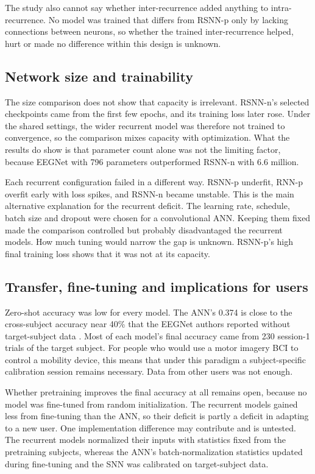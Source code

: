 \documentclass[conference]{IEEEtran}
\begin{document}
The study also cannot say whether inter-recurrence added anything to intra-recurrence. No model was trained that differs from RSNN-p only by lacking connections between neurons, so whether the trained inter-recurrence helped, hurt or made no difference within this design is unknown.

\subsection{Network size and trainability}
\label{sec:trainability}

The size comparison does not show that capacity is irrelevant. RSNN-n's selected checkpoints came from the first few epochs, and its training loss later rose. Under the shared settings, the wider recurrent model was therefore not trained to convergence, so the comparison mixes capacity with optimization. What the results do show is that parameter count alone was not the limiting factor, because EEGNet with 796 parameters outperformed RSNN-n with 6.6 million.

Each recurrent configuration failed in a different way. RSNN-p underfit, RNN-p overfit early with loss spikes, and RSNN-n became unstable. This is the main alternative explanation for the recurrent deficit. The learning rate, schedule, batch size and dropout were chosen for a convolutional ANN. Keeping them fixed made the comparison controlled but probably disadvantaged the recurrent models. How much tuning would narrow the gap is unknown. RSNN-p's high final training loss shows that it was not at its capacity.

\subsection{Transfer, fine-tuning and implications for users}

Zero-shot accuracy was low for every model. The ANN's 0.374 is close to the cross-subject accuracy near 40\% that the EEGNet authors reported without target-subject data \cite{lawhern2018}. Most of each model's final accuracy came from 230 session-1 trials of the target subject. For people who would use a motor imagery BCI to control a mobility device, this means that under this paradigm a subject-specific calibration session remains necessary. Data from other users was not enough.

Whether pretraining improves the final accuracy at all remains open, because no model was fine-tuned from random initialization. The recurrent models gained less from fine-tuning than the ANN, so their deficit is partly a deficit in adapting to a new user. One implementation difference may contribute and is untested. The recurrent models normalized their inputs with statistics fixed from the pretraining subjects, whereas the ANN's batch-normalization statistics updated during fine-tuning and the SNN was calibrated on target-subject data.
\end{document}
